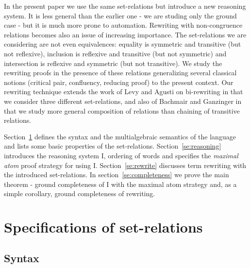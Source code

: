 In the present paper we use the same set-relations but introduce a new 
reasoning system. 
It is less general than the earlier one - we are studing only the 
ground case - but it is much more prone to automation. 
Rewriting with non-congruence relations becomes also an issue of increasing 
importance.
The set-relations we are considering are not even equivalences:
 equality is symmetric and transitive (but not reflexive),
inclusion is reflexive and transitive (but not symmetric) and intersection 
is reflexive and symmetric (but not transitive).
We study the rewriting proofs in the presence of these relations generalizing
several classical notions (critical pair, confluency, reducing proof) to the
present context. Our rewriting technique extends the 
work of Levy and Agusti on bi-rewriting \cite{LA} in that we consider three
different set-relations, and also of Bachmair and Ganzinger
 \cite{BG249} in that we study more general composition 
of relations than chaining of transitive relations.

Section~\ref{se:nd-specs} defines the syntax and the multialgebraic
semantics of the language and lists some basic properties of the set-relations.
Section~\ref{se:reasoning} introduces the reasoning system \C I, 
ordering of words and specifies the {\em maximal atom} proof
 strategy for using \C I. Section~\ref{se:rewrite} discusses term rewriting
with the introduced set-relations. In section~\ref{se:completeness} we prove
the main theorem - ground completeness of \C I with the maximal atom strategy
and, as a simple corollary, ground completeness of rewriting.

\section{Specifications of set-relations} \label{se:nd-specs}

\subsection{Syntax}


